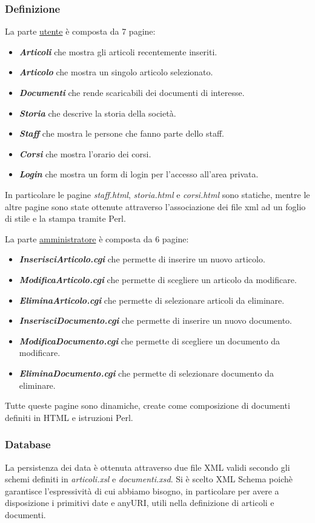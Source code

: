 \subsubsection{Definizione}
	\noindent La parte \underline{utente} \`e composta da 7 pagine:
\begin{itemize}
	\item {\bfseries\textit{Articoli}} che mostra gli articoli recentemente inseriti.
	\item {\bfseries\textit{Articolo}} che mostra un singolo articolo selezionato.
	\item {\bfseries\textit{Documenti}} che rende scaricabili dei documenti di interesse.
	\item {\bfseries\textit{Storia}} che descrive la storia della societ\`a.
	\item {\bfseries\textit{Staff}} che mostra le persone che fanno parte dello staff.
	\item {\bfseries\textit{Corsi}} che mostra l'orario dei corsi.
	\item {\bfseries\textit{Login}} che mostra un form di login per l'accesso all'area privata.
\end{itemize}
	In particolare le pagine \textit{staff.html}, \textit{storia.html} e \textit{corsi.html} sono statiche, mentre le altre pagine sono state ottenute attraverso l'associazione dei file xml ad un foglio di stile e la stampa tramite Perl.

La parte \underline{amministratore} \`e composta da 6 pagine:
\begin{itemize}
	\item {\bfseries\textit{InserisciArticolo.cgi}} che permette di inserire un nuovo articolo.
	\item {\bfseries\textit{ModificaArticolo.cgi}} che permette di scegliere un articolo da modificare.
	\item {\bfseries\textit{EliminaArticolo.cgi}} che permette di selezionare articoli da eliminare.
	\item {\bfseries\textit{InserisciDocumento.cgi}} che permette di inserire un nuovo documento.
	\item {\bfseries\textit{ModificaDocumento.cgi}} che permette di scegliere un documento da modificare.
	\item {\bfseries\textit{EliminaDocumento.cgi}} che permette di selezionare documento da eliminare.
\end{itemize}	
	
	Tutte queste pagine sono dinamiche, create come composizione di documenti definiti in HTML e istruzioni Perl.
	
\subsubsection{Database}
	La persistenza dei data \`e ottenuta attraverso due file XML validi secondo gli schemi definiti in \textit{articoli.xsl} e \textit{documenti.xsd}. Si \`e scelto XML Schema poich\`e garantisce l'espressivit\`a di cui abbiamo bisogno, in particolare per avere a disposizione i primitivi date e anyURI, utili nella definizione di articoli e documenti.